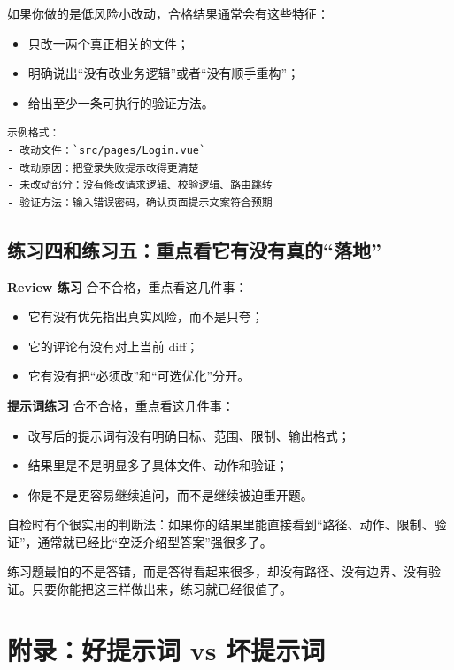 \documentclass[UTF8,a4paper,12pt]{ctexart}
\begin{document}
如果你做的是低风险小改动，合格结果通常会有这些特征：
\begin{itemize}
  \item 只改一两个真正相关的文件；
  \item 明确说出“没有改业务逻辑”或者“没有顺手重构”；
  \item 给出至少一条可执行的验证方法。
\end{itemize}

\begin{lstlisting}[style=cli]
示例格式：
- 改动文件：`src/pages/Login.vue`
- 改动原因：把登录失败提示改得更清楚
- 未改动部分：没有修改请求逻辑、校验逻辑、路由跳转
- 验证方法：输入错误密码，确认页面提示文案符合预期
\end{lstlisting}

\subsection{练习四和练习五：重点看它有没有真的“落地”}

\textbf{Review 练习} 合不合格，重点看这几件事：
\begin{itemize}
  \item 它有没有优先指出真实风险，而不是只夸；
  \item 它的评论有没有对上当前 diff；
  \item 它有没有把“必须改”和“可选优化”分开。
\end{itemize}

\textbf{提示词练习} 合不合格，重点看这几件事：
\begin{itemize}
  \item 改写后的提示词有没有明确目标、范围、限制、输出格式；
  \item 结果里是不是明显多了具体文件、动作和验证；
  \item 你是不是更容易继续追问，而不是继续被迫重开题。
\end{itemize}

\begin{tipbox}
自检时有个很实用的判断法：如果你的结果里能直接看到“路径、动作、限制、验证”，通常就已经比“空泛介绍型答案”强很多了。
\end{tipbox}

\begin{sumbox}
练习题最怕的不是答错，而是答得看起来很多，却没有路径、没有边界、没有验证。只要你能把这三样做出来，练习就已经很值了。
\end{sumbox}

\section{附录：好提示词 vs 坏提示词}
\end{document}
